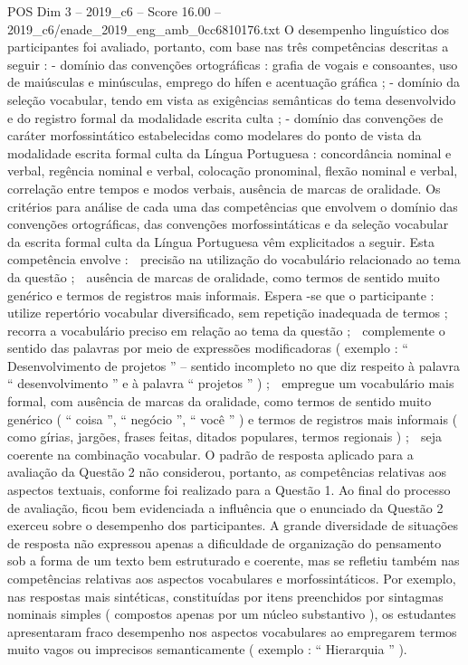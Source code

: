 \begin{textsample}{POS Dim 3 – 2019\_c6 – Score 16.00 – 2019\_c6/enade\_2019\_eng\_amb\_0cc6810176.txt}
O desempenho linguístico dos participantes foi avaliado, portanto, com base nas três competências descritas a seguir : - domínio das convenções ortográficas : grafia de vogais e consoantes, uso de maiúsculas e minúsculas, emprego do hífen e acentuação gráfica ; - domínio da seleção vocabular, tendo em vista as exigências semânticas do tema desenvolvido e do registro formal da modalidade escrita culta ; - domínio das convenções de caráter morfossintático estabelecidas como modelares do ponto de vista da modalidade escrita formal culta da Língua Portuguesa : concordância nominal e verbal, regência nominal e verbal, colocação pronominal, flexão nominal e verbal, correlação entre tempos e modos verbais, ausência de marcas de oralidade.
Os critérios para análise de cada uma das competências que envolvem o domínio das convenções ortográficas, das convenções morfossintáticas e da seleção vocabular da escrita formal culta da Língua Portuguesa vêm explicitados a seguir.
Esta competência envolve :  precisão na utilização do vocabulário relacionado ao tema da questão ;  ausência de marcas de oralidade, como termos de sentido muito genérico e termos de registros mais informais.
Espera -se que o participante :  utilize repertório vocabular diversificado, sem repetição inadequada de termos ;  recorra a vocabulário preciso em relação ao tema da questão ;  complemente o sentido das palavras por meio de expressões modificadoras ( exemplo : “ Desenvolvimento de projetos ” – sentido incompleto no que diz respeito à palavra “ desenvolvimento ” e à palavra “ projetos ” ) ;  empregue um vocabulário mais formal, com ausência de marcas da oralidade, como termos de sentido muito genérico ( “ coisa ”, “ negócio ”, “ você ” ) e termos de registros mais informais ( como gírias, jargões, frases feitas, ditados populares, termos regionais ) ;  seja coerente na combinação vocabular.
O padrão de resposta aplicado para a avaliação da Questão 2 não considerou, portanto, as competências relativas aos aspectos textuais, conforme foi realizado para a Questão 1.
Ao final do processo de avaliação, ficou bem evidenciada a influência que o enunciado da Questão 2 exerceu sobre o desempenho dos participantes.
A grande diversidade de situações de resposta não expressou apenas a dificuldade de organização do pensamento sob a forma de um texto bem estruturado e coerente, mas se refletiu também nas competências relativas aos aspectos vocabulares e morfossintáticos.
Por exemplo, nas respostas mais sintéticas, constituídas por itens preenchidos por sintagmas nominais simples ( compostos apenas por um núcleo substantivo ), os estudantes apresentaram fraco desempenho nos aspectos vocabulares ao empregarem termos muito vagos ou imprecisos semanticamente ( exemplo : “ Hierarquia ” ).

\end{textsample}
